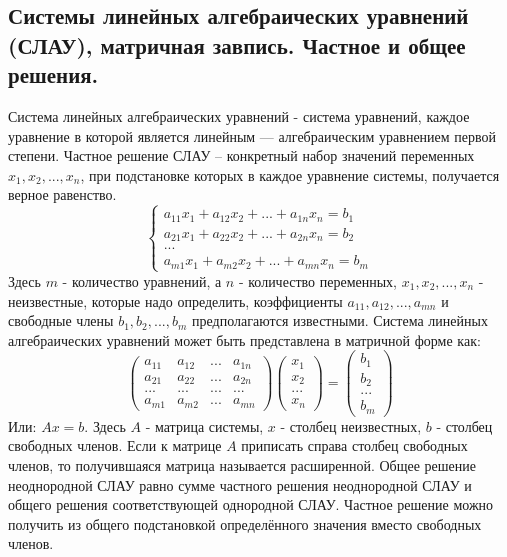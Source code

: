 \documentclass[a4paper,14pt]{article}
\begin{document}
\subsection{Системы линейных алгебраических уравнений (СЛАУ), матричная завпись. Частное и общее решения.}
Система линейных алгебраических уравнений - система уравнений, каждое уравнение в которой является линейным — алгебраическим уравнением первой степени.
Частное решение СЛАУ – конкретный набор значений переменных $x_1, x_2, ..., x_n$, при подстановке которых в каждое уравнение системы, получается верное равенство.
\[
\begin{cases}
	a_{11}x_1 + a_{12}x_2 + ... + a_{1n}x_n = b_1 \\
	a_{21}x_1 + a_{22}x_2 + ... + a_{2n}x_n = b_2 \\
	... \\
	a_{m1}x_1 + a_{m2}x_2 + ... + a_{mn}x_n = b_m
\end{cases}
\]
\noindent Здесь $m$ - количество уравнений, а $n$ - количество переменных, $x_1, x_2, ..., x_n$ - неизвестные, которые надо определить, коэффициенты $a_{11}, a_{12}, ..., a_{mn}$ и  свободные члены $b_1, b_2, ..., b_m$ предполагаются известными.
Система линейных алгебраических уравнений может быть представлена в матричной форме как:
\[
\begin{pmatrix}
a_{11} & a_{12} & ... & a_{1n} \\
a_{21} & a_{22} & ... & a_{2n} \\
... & ... & ... & ... \\
a_{m1} & a_{m2} & ... & a_{mn}
\end{pmatrix}
\begin{pmatrix}
x_1 \\ x_2 \\ ... \\ x_n
\end{pmatrix}
=
\begin{pmatrix}
b_1 \\ b_2 \\ ... \\ b_m
\end{pmatrix}
\]
\noindent Или: $Ax=b$. Здесь $A$ - матрица системы, $x$ -  столбец неизвестных, $b$ - столбец свободных членов. Если к матрице $A$ приписать справа столбец свободных членов, то получившаяся матрица называется расширенной.
Общее решение неоднородной СЛАУ равно сумме частного решения неоднородной СЛАУ и общего решения соответствующей однородной СЛАУ. Частное решение можно получить из общего подстановкой определённого значения вместо свободных членов.
\end{document}
